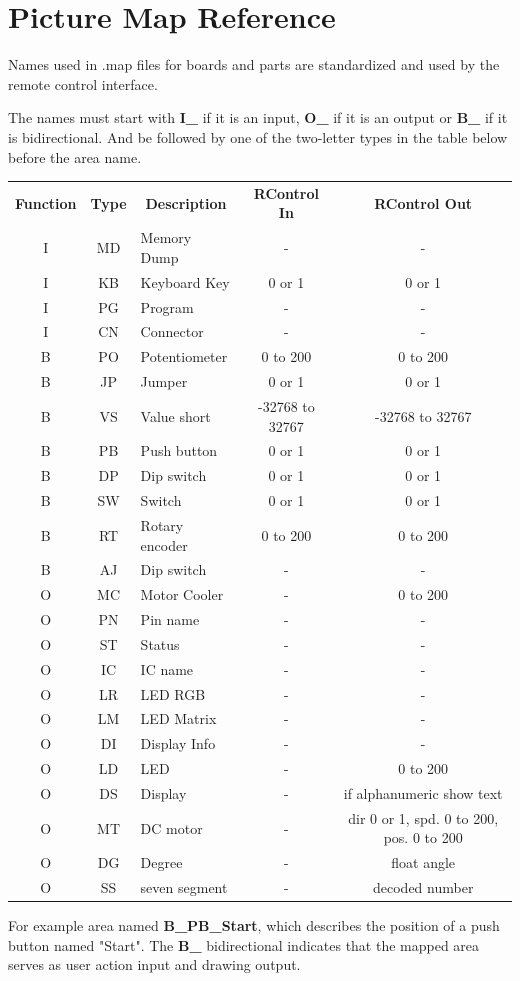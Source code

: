 \section{Picture Map Reference}\hypertarget{def:map}{}

Names used in .map files for boards and parts are standardized and used by the remote control interface. 

The names must start with \textbf{I\_} if it is an input, \textbf{O\_} if it is an output or \textbf{B\_} if it
is bidirectional. 
And be followed by one of the two-letter types in the table below before the area name. 

{%
\newcommand{\mc}[3]{\multicolumn{#1}{#2}{#3}}
\begin{center}
\begin{tabular}{cclcc}
\textbf{Function} & \textbf{Type} & \mc{1}{c}{\textbf{Description}} & \textbf{RControl In} & \textbf{RControl Out}\\
I & MD & Memory Dump & - & -\\
I & KB & Keyboard Key & 0 or 1 & 0 or 1\\
I & PG & Program & - & -\\
I & CN & Connector & - & -\\
B & PO & Potentiometer & 0 to 200 & 0 to 200\\
B & JP & Jumper & 0 or 1 & 0 or 1\\
B & VS & Value short & -32768 to 32767 & -32768 to 32767\\
B & PB & Push button & 0 or 1 & 0 or 1\\
B & DP & Dip switch & 0 or 1 & 0 or 1\\
B & SW & Switch & 0 or 1 & 0 or 1\\
B & RT & Rotary encoder & 0 to 200 & 0 to 200\\
B & AJ & Dip switch & - & -\\
O & MC & Motor Cooler & - & 0 to 200\\
O & PN & Pin name & - & -\\
O & ST & Status & - & -\\
O & IC & IC name & - & -\\
O & LR & LED RGB & - & -\\
O & LM & LED Matrix & - & -\\
O & DI & Display Info & - & -\\
O & LD & LED & - & 0 to 200\\
O & DS & Display & - & if alphanumeric show text\\
O & MT & DC motor & - & dir 0 or 1, spd. 0 to 200, pos. 0 to 200\\
O & DG & Degree & - & float angle\\
O & SS & seven segment & - & decoded number\\
\end{tabular}
\end{center}
}
 

For example area named \textbf{B\_PB\_Start}, which describes the position of a push button named "Start". 
The \textbf{B\_} bidirectional indicates that the mapped area serves as user action input and drawing output.  
 
